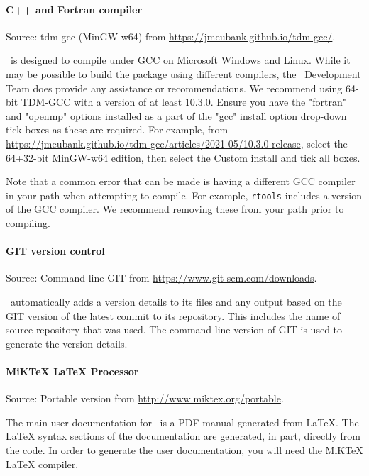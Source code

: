 \paragraph*{C++ and Fortran compiler}

Source: tdm-gcc (MinGW-w64) from \url{https://jmeubank.github.io/tdm-gcc/}.

\CNAME\ is designed to compile under GCC on Microsoft Windows and Linux. While it may be possible to build the package using different compilers, the \CNAME\ Development Team does provide any assistance or recommendations. We recommend using 64-bit TDM-GCC with a version of at least 10.3.0. Ensure you have the "fortran" and "openmp" options installed as a part of the "gcc" install option drop-down tick boxes as these are required. For example, from  \url{https://jmeubank.github.io/tdm-gcc/articles/2021-05/10.3.0-release}, select the 64+32-bit MinGW-w64 edition, then select the Custom install and tick all boxes. 

Note that a common error that can be made is having a different GCC compiler in your path when attempting to compile. For example, \texttt{rtools} includes a version of the GCC compiler. We recommend removing these from your path prior to compiling.

\paragraph*{GIT version control}

Source: Command line GIT from \url{https://www.git-scm.com/downloads}.

\CNAME\ automatically adds a version details to its files and any output based on the GIT version of the latest commit to its repository. This includes the name of source repository that was used. The command line version of GIT is used  to generate the version details.

\paragraph*{MiKTeX LaTeX Processor}

Source: Portable version from \url{http://www.miktex.org/portable}.

The main user documentation for \CNAME\ is a PDF manual generated from LaTeX. The LaTeX syntax sections of the documentation are generated, in part, directly from the code. In order to generate the user documentation, you will need the MiKTeX LaTeX compiler.

